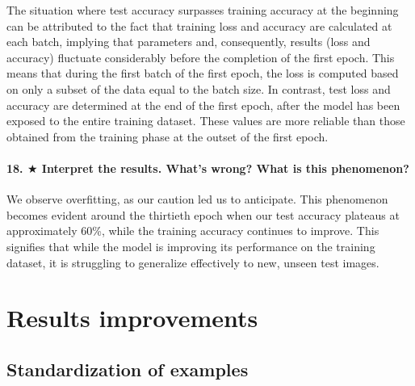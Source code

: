 The situation where test accuracy surpasses training accuracy at the beginning can be attributed to the fact that training loss and accuracy are calculated at each batch, implying that parameters and, consequently, results (loss and accuracy) fluctuate considerably before the completion of the first epoch. This means that during the first batch of the first epoch, the loss is computed based on only a subset of the data equal to the batch size. In contrast, test loss and accuracy are determined at the end of the first epoch, after the model has been exposed to the entire training dataset. These values are more reliable than those obtained from the training phase at the outset of the first epoch.




\paragraph{18. $ \bigstar $ Interpret the results. What's wrong? What is this phenomenon?}
We observe overfitting, as our caution led us to anticipate. This phenomenon becomes evident around the thirtieth epoch when our test accuracy plateaus at approximately 60\%, while the training accuracy continues to improve. This signifies that while the model is improving its performance on the training dataset, it is struggling to generalize effectively to new, unseen test images.

\section{Results improvements}
\subsection{Standardization of examples}
